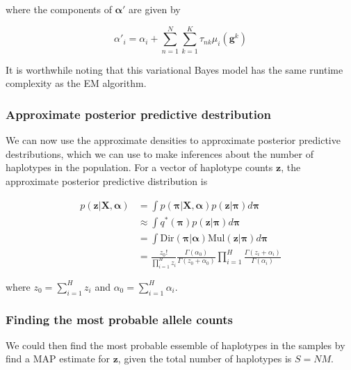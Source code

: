 \documentclass{article}
\begin{document}
where the components of $\boldsymbol{\alpha}'$ are given by

\begin{equation}
\alpha'_i = \alpha_i + \sum_{n = 1}^N \sum_{k = 1}^K \tau_{nk} \mu_i(\boldsymbol{g}^k)
\end{equation}

It is worthwhile noting that this variational Bayes model has the same runtime complexity as the EM algorithm.

\subsubsection{Approximate posterior predictive destribution}

We can now use the approximate densities to approximate posterior predictive destributions, which we can use to make inferences about the number of haplotypes in the population. For a vector of haplotype counts $\boldsymbol{z}$, the approximate posterior predictive distribution is

\begin{align}
    p(\boldsymbol{z} | \boldsymbol{X}, \boldsymbol{\alpha}) &= \int p(\boldsymbol{\pi} | \boldsymbol{X}, \boldsymbol{\alpha}) p(\boldsymbol{z} | \boldsymbol{\pi}) d\boldsymbol{\pi}\\
    &\approx \int q^*(\boldsymbol{\pi}) p(\boldsymbol{z} | \boldsymbol{\pi}) d\boldsymbol{\pi}\\
    &= \int \text{Dir}(\boldsymbol{\pi} | \boldsymbol{\alpha}) \text{Mul}(\boldsymbol{z} | \boldsymbol{\pi}) d\boldsymbol{\pi}\\
    &= \frac{z_0!}{\prod_{i = 1}^{H} z_i} \frac{\Gamma(\alpha_0)}{\Gamma(z_0 + \alpha_0)} \prod_{i = 1}^H \frac{\Gamma(z_i + \alpha_i)}{\Gamma(\alpha_i)}
\end{align}

where $z_0 = \sum_{i = 1}^H z_i$ and $\alpha_0 = \sum_{i = 1}^H \alpha_i$.

\subsubsection{Finding the most probable allele counts}

We could then find the most probable essemble of haplotypes in the samples by find a MAP estimate for $\boldsymbol{z}$, given the total number of haplotypes is $S = NM$.
\end{document}
